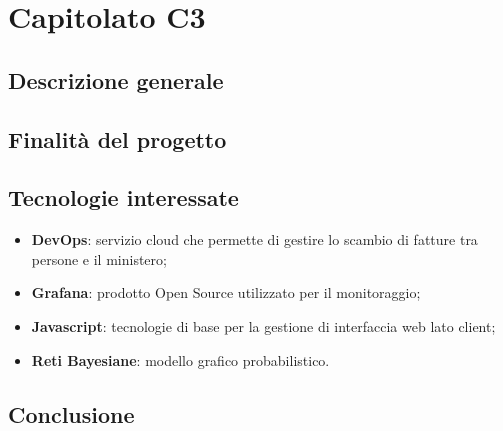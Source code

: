 \chapter{Capitolato C3}
\section{Descrizione generale}

\section{Finalit\`a del progetto}

\section{Tecnologie interessate}
\begin{itemize}
	\item \textbf{DevOps}: servizio cloud che permette di gestire lo scambio di fatture tra persone e il ministero;
	\item \textbf{Grafana}: prodotto Open Source utilizzato per il monitoraggio;
	\item \textbf{Javascript}: tecnologie di base per la gestione di interfaccia web lato client;
	\item \textbf{Reti Bayesiane}: modello grafico probabilistico.
\end{itemize}
\section{Conclusione}

